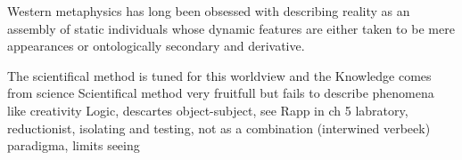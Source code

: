 

















Western metaphysics has long been obsessed with describing reality as an assembly of static individuals whose dynamic features are either taken to be mere appearances or ontologically secondary and derivative. 

The scientifical method is tuned for this worldview and the 
Knowledge comes from science
Scientifical method very fruitfull but fails to describe phenomena like creativity
Logic, descartes object-subject, see Rapp in ch 5
\cite[chapter 5]{rapp1990whitehad}
labratory, reductionist, isolating and testing, not as a combination (interwined verbeek)
paradigma, limits seeing
\cite[ch 5]{rapp1990whitehad}

